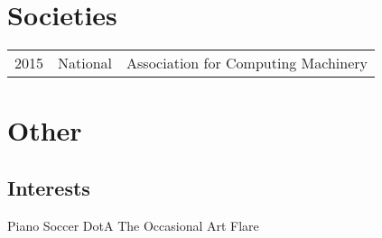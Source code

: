 \documentclass[]{deedy-resume-openfont}
\begin{document}
\begin{minipage}[t]{0.66\textwidth}
\sectionsep


\section{Societies} 

\begin{tabular}{rll}
2015         & National  & Association for Computing Machinery\\
\end{tabular}

\sectionsep


\section{Other} 
\subsection{Interests}
Piano \textbullet{} Soccer \textbullet{} DotA \textbullet{} The Occasional Art Flare \\
\sectionsep

\end{minipage} 
\end{document}
